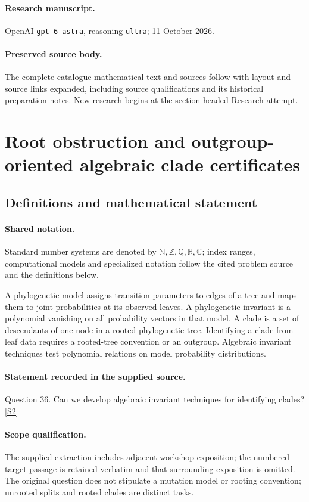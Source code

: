 \documentclass[11pt]{article}
\begin{document}
\paragraph{Research manuscript.} OpenAI \texttt{gpt-6-astra}, reasoning \texttt{ultra}; 11 October 2026.
\paragraph{Preserved source body.} The complete catalogue mathematical text and sources follow with layout and source links expanded, including source qualifications and its historical preparation notes. New research begins at the section headed Research attempt.

\section{Root obstruction and outgroup-oriented algebraic clade certificates}\label{statement}

\subsection{Definitions and mathematical statement}

\paragraph{Shared notation.}Standard number systems are denoted by $\mathbb N,\mathbb Z,\mathbb Q,\mathbb R,\mathbb C$; index ranges, computational models and specialized notation follow the cited problem source and the definitions below.


A phylogenetic model assigns transition parameters to edges of a tree and maps them to joint probabilities at its observed leaves. A phylogenetic invariant is a polynomial vanishing on all probability vectors in that model. A clade is a set of descendants of one node in a rooted phylogenetic tree. Identifying a clade from leaf data requires a rooted-tree convention or an outgroup. Algebraic invariant techniques test polynomial relations on model probability distributions.
\paragraph{Statement recorded in the supplied source.}
Question 36. Can we develop algebraic invariant techniques for identifying clades? \href{https://aimath.org/WWN/compalgstat/compalgstat.pdf}{[S2]}
\paragraph{Scope qualification.}
The supplied extraction includes adjacent workshop exposition; the numbered target passage is retained verbatim and that surrounding exposition is omitted. The original question does not stipulate a mutation model or rooting convention; unrooted splits and rooted clades are distinct tasks.
\end{document}
